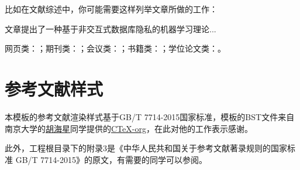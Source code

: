 \noindent 比如在文献综述中，你可能需要这样列举文章所做的工作：

文章提出了一种基于非交互式数据库隐私的机器学习理论...

网页类：\cite{muzi2020ctex,seugs2015rule,seugs2018license}；期刊类：\cite{blum2013learning,JSJX202411005}；会议类：\cite{HeZhang-6041,srivastava2011operating,tseng2021codedbulk}；书籍类：\cite{feng2019androidsecurity,williams2006gaussian}；学位论文类：\cite{gibbs1998bayesian,RN10,RN11}。

\section{参考文献样式}

本模板的参考文献渲染样式基于GB/T 7714-2015国家标准，模板的BST文件来自南京大学的\href{https://github.com/Haixing-Hu}{胡海星}同学提供的\href{https://github.com/CTeX-org/gbt7714-bibtex-style}{CTeX-org}，在此对他的工作表示感谢。

此外，工程根目录下的附录3是《中华人民共和国关于参考文献著录规则的国家标准 GB/T 7714-2015》的原文，有需要的同学可以参阅。
